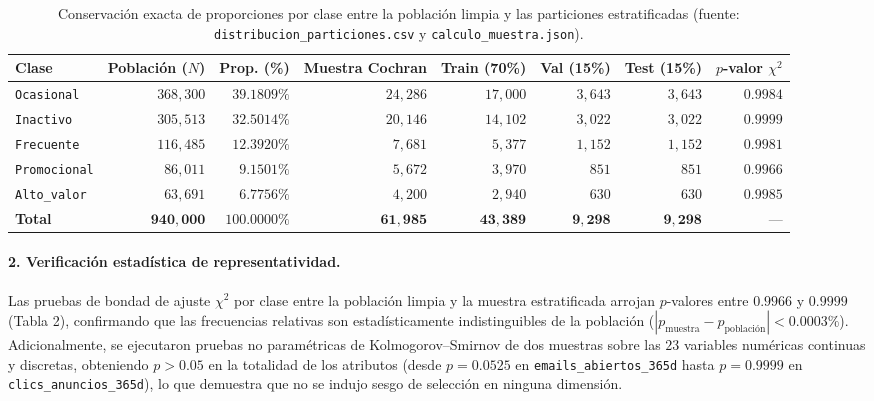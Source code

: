 \documentclass[11pt,a4paper]{article}
\newcommand{\code}[1]{\texttt{\small #1}}
\begin{document}
\begin{table}[H]
\centering
\caption{Conservación exacta de proporciones por clase entre la población limpia y las particiones estratificadas (fuente: \code{distribucion\_particiones.csv} y \code{calculo\_muestra.json}).}
\footnotesize
\setlength{\tabcolsep}{0pt}
\begin{tabular*}{\textwidth}{@{\extracolsep{\fill}} lrrrrrrr @{}}
\toprule
\textbf{Clase} & \textbf{Población ($N$)} & \textbf{Prop. (\%)} & \textbf{Muestra Cochran} & \textbf{Train (70\%)} & \textbf{Val (15\%)} & \textbf{Test (15\%)} & \textbf{$p$-valor $\chi^2$} \\
\midrule
\code{Ocasional}   & $368{,}300$ & $39.1809\%$ & $24{,}286$ & $17{,}000$ & $3{,}643$ & $3{,}643$ & $0.9984$ \\
\code{Inactivo}    & $305{,}513$ & $32.5014\%$ & $20{,}146$ & $14{,}102$ & $3{,}022$ & $3{,}022$ & $0.9999$ \\
\code{Frecuente}   & $116{,}485$ & $12.3920\%$ &  $7{,}681$ &  $5{,}377$ & $1{,}152$ & $1{,}152$ & $0.9981$ \\
\code{Promocional} &  $86{,}011$ &  $9.1501\%$ &  $5{,}672$ &  $3{,}970$ &   $851$   &   $851$   & $0.9966$ \\
\code{Alto\_valor} &  $63{,}691$ &  $6.7756\%$ &  $4{,}200$ &  $2{,}940$ &   $630$   &   $630$   & $0.9985$ \\
\midrule
\textbf{Total}     & $\mathbf{940{,}000}$ & $\mathbf{100.0000\%}$ & $\mathbf{61{,}985}$ & $\mathbf{43{,}389}$ & $\mathbf{9{,}298}$ & $\mathbf{9{,}298}$ & --- \\
\bottomrule
\end{tabular*}
\end{table}

\paragraph{2. Verificación estadística de representatividad.}
Las pruebas de bondad de ajuste $\chi^2$ por clase entre la población limpia y la muestra estratificada arrojan $p$-valores entre $0.9966$ y $0.9999$ (Tabla 2), confirmando que las frecuencias relativas son estadísticamente indistinguibles de la población ($|p_{\text{muestra}} - p_{\text{población}}| < 0.0003\%$). Adicionalmente, se ejecutaron pruebas no paramétricas de Kolmogorov--Smirnov de dos muestras sobre las $23$ variables numéricas continuas y discretas, obteniendo $p > 0.05$ en la totalidad de los atributos (desde $p = 0.0525$ en \code{emails\_abiertos\_365d} hasta $p = 0.9999$ en \code{clics\_anuncios\_365d}), lo que demuestra que no se indujo sesgo de selección en ninguna dimensión.
\end{document}

